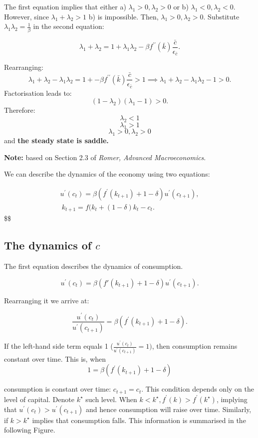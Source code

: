 \documentclass[11pt,a4paper,english]{article}
\begin{document}
The first equation implies that either a)
\(\lambda_{1} > 0, \lambda_{2} > 0\) or b)
\(\lambda_{1} < 0, \lambda_{2} < 0.\) However, since
\(\lambda_{1} + \lambda_{2} > 1\) b) is impossible. Then,
\(\lambda_{1} > 0, \lambda_{2} > 0.\) Substitute
\(\lambda_{1} \lambda_{2} = \frac{1}{\beta}\) in the second equation:

\[ \lambda_{1} + \lambda_{2} = 1+ \lambda_{1} \lambda_{2} - \beta f^{\prime \prime}(\bar{k})\frac{\bar{c}}{\epsilon_{\bar{c}}}.\]

Rearranging:
\[ \lambda_{1} + \lambda_{2} - \lambda_{1} \lambda_{2} =  1+  - \beta f^{\prime \prime}(\bar{k})\frac{\bar{c}}{\epsilon_{\bar{c}}} > 1 \implies \lambda_{1} + \lambda_{2} - \lambda_{1}\lambda_{2} - 1 >0.\]
Factorisation leads to: \[(1 - \lambda_{2})(\lambda_{1} - 1) > 0.\]
Therefore: \[ \lambda_{2} < 1 \] \[ \lambda_{1} > 1 \]
\[ \lambda_{1} > 0, \lambda_{2} > 0\] and \textbf{the steady state is
saddle.}

\textbf{Note:} based on Section 2.3 of \emph{Romer, Advanced
Macroeconomics}.

We can describe the dynamics of the economy using two equations:

\begin{eqnarray}
u^{\prime}(c_{t}) = \beta(f^{\prime}(k_{t+1}) + 1 - \delta)u^{\prime}(c_{t+1}), \\\
k_{t+1} = f(k_{t} + (1-\delta)k_{t} - c_{t}.
\end{eqnarray} \$\$

\hypertarget{the-dynamics-of-c}{%
\subsection{\texorpdfstring{The dynamics of
\(c\)}{The dynamics of c}}\label{the-dynamics-of-c}}

The first equation describes the dynamics of consumption.

\[u^{\prime}(c_{t}) = \beta ( f{\prime}(k_{t+1}) + 1 - \delta) u^{\prime}(c_{t+1}).\]

Rearranging it we arrive at:

\[\frac{u^{\prime}(c_{t})}{u^{\prime}(c_{t+1})} = \beta ( f^{\prime}(k_{t+1}) + 1 - \delta).\]

If the left-hand side term equals 1
(\(\frac{u^{\prime}(c_{t})}{u^{\prime}(c_{t+1})} = 1)\), then
consumption remains constant over time. This is, when
\[ 1 = \beta ( f^{\prime}(k_{t+1}) + 1 - \delta)\]

consumption is constant over time: \(c_{t+1} = c_{t}.\) This condition
depends only on the level of capital. Denote \(k^{\star}\) such level.
When \(k < k^{\star}, f^{\prime}(k) > f^{\prime}(k^{\star})\), implying
that \(u^{\prime}(c_{t}) > u^{\prime}(c_{t+1})\) and hence consumption
will raise over time. Similarly, if \(k > k^{\star}\) implies that
consumption falls. This information is summarised in the following
Figure.
\end{document}
